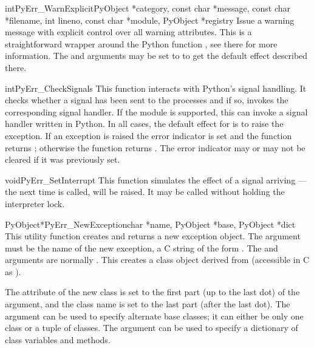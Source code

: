 \begin{cfuncdesc}{int}{PyErr_WarnExplicit}{PyObject *category,
                const char *message, const char *filename, int lineno,
                const char *module, PyObject *registry}
  Issue a warning message with explicit control over all warning
  attributes.  This is a straightforward wrapper around the Python
  function , see there for more
  information.  The  and  arguments may be
  set to \NULL{} to get the default effect described there.
\end{cfuncdesc}

\begin{cfuncdesc}{int}{PyErr_CheckSignals}{}
  This function interacts with Python's signal handling.  It checks
  whether a signal has been sent to the processes and if so, invokes
  the corresponding signal handler.  If the
   module is supported, this can
  invoke a signal handler written in Python.  In all cases, the
  default effect for  is to raise the
   exception.  If an exception is raised
  the error indicator is set and the function returns ;
  otherwise the function returns .  The error indicator may or
  may not be cleared if it was previously set.
\end{cfuncdesc}

\begin{cfuncdesc}{void}{PyErr_SetInterrupt}{}
  This function simulates the effect of a
   signal arriving --- the next time
   is called,
   will be raised.  It may be called
  without holding the interpreter lock.
\end{cfuncdesc}

\begin{cfuncdesc}{PyObject*}{PyErr_NewException}{char *name,
                                                 PyObject *base,
                                                 PyObject *dict}
  This utility function creates and returns a new exception object.
  The  argument must be the name of the new exception, a C
  string of the form .  The  and
   arguments are normally \NULL.  This creates a class
  object derived from  (accessible in C as
  ).

  The  attribute of the new class is set to the
  first part (up to the last dot) of the  argument, and the
  class name is set to the last part (after the last dot).  The
   argument can be used to specify alternate base classes;
  it can either be only one class or a tuple of classes.
  The  argument can be used to specify a dictionary of class
  variables and methods.
\end{cfuncdesc}

